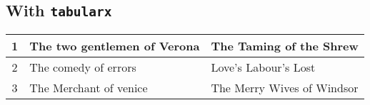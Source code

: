 \subsection{With \texttt{tabularx} }
\begin{tabularx}{10cm}{|c|p{4cm}|X|}
    \hline
    1 & The two gentlemen of Verona & The Taming of the Shrew \\
    \hline
    2 & The comedy of errors & Love's Labour's Lost \\
    \hline
    3 & The Merchant of venice & The Merry Wives of Windsor \\
    \hline
\end{tabularx}



